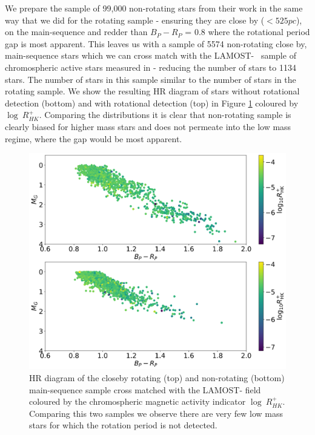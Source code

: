 We prepare the sample of 99,000 non-rotating stars from their work in the same way that we did for the rotating sample - ensuring they are close by ($<525 pc$), on the main-sequence and redder than $B_P-R_P$  = 0.8 where the rotational period gap is most apparent.
This leaves us with a sample of 5574 non-rotating close by, main-sequence stars which we can cross match with the LAMOST-\kepler{} \ sample of chromospheric active stars measured in \citet{zhang_magnetic_2020} - reducing the number of stars to 1134 stars.
The number of stars in this sample similar to the number of stars in the rotating sample.
We show the resulting HR diagram of stars without rotational detection (bottom) and with rotational detection (top) in Figure \ref{fig:non_rotating_mag_hr} coloured by $\log \ R^{+}_{HK}$.
Comparing the distributions it is clear that non-rotating sample is clearly biased for higher mass stars and does not permeate into the low mass regime, where the gap would be most apparent.


\begin{figure}
\centering
    \includegraphics[width=\textwidth]{Figures/rot_gap_figures/HR_mag_and_non_rot.png}
    \caption{
    HR diagram of the closeby rotating (top) and non-rotating (bottom) main-sequence sample cross matched with the LAMOST-\kepler{} field coloured by the chromospheric magnetic activity indicator $\log \ R^{+}_{HK}$.
    Comparing this two samples we observe there are very few low mass stars for which the rotation period is not detected.}
    \label{fig:non_rotating_mag_hr}
\end{figure}


